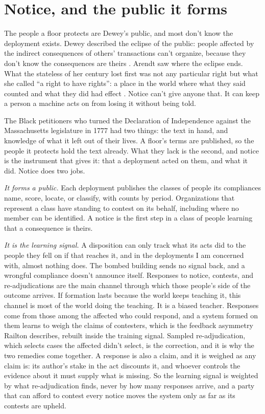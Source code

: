 \section{Notice, and the public it forms}
\label{sec:8.2}
The people a floor protects are Dewey's public, and most don't know the deployment exists. Dewey described the eclipse of the public: people affected by the indirect consequences of others' transactions can't organize, because they don't know the consequences are theirs \autocite{dewey1927public}. Arendt saw where the eclipse ends. What the stateless of her century lost first was not any particular right but what she called “a right to have rights”: a place in the world where what they said counted and what they did had effect \autocite{arendt1951origins}. Notice can't give anyone that. It can keep a person a machine acts on from losing it without being told.

The Black petitioners who turned the Declaration of Independence against the Massachusetts legislature in 1777 had two things: the text in hand, and knowledge of what it left out of their lives. A floor's terms are published, so the people it protects hold the text already. What they lack is the second, and notice is the instrument that gives it: that a deployment acted on them, and what it did. Notice does two jobs.

\emph{It forms a public.} Each deployment publishes the classes of people its compliances name, score, locate, or classify, with counts by period. Organizations that represent a class have standing to contest on its behalf, including where no member can be identified. A notice is the first step in a class of people learning that a consequence is theirs.

\emph{It is the learning signal.} A disposition can only track what its acts did to the people they fell on if that reaches it, and in the deployments I am concerned with, almost nothing does. The bombed building sends no signal back, and a wrongful compliance doesn't announce itself. Responses to notice, contests, and re-adjudications are the main channel through which those people's side of the outcome arrives. If formation lasts because the world keeps teaching it, this channel is most of the world doing the teaching. It is a biased teacher. Responses come from those among the affected who could respond, and a system formed on them learns to weigh the claims of contesters, which is the feedback asymmetry Railton describes, rebuilt inside the training signal. Sampled re-adjudication, which selects cases the affected didn't select, is the correction, and it is why the two remedies come together. A response is also a claim, and it is weighed as any claim is: its author's stake in the act discounts it, and whoever controls the evidence about it must supply what is missing. So the learning signal is weighted by what re-adjudication finds, never by how many responses arrive, and a party that can afford to contest every notice moves the system only as far as its contests are upheld.

